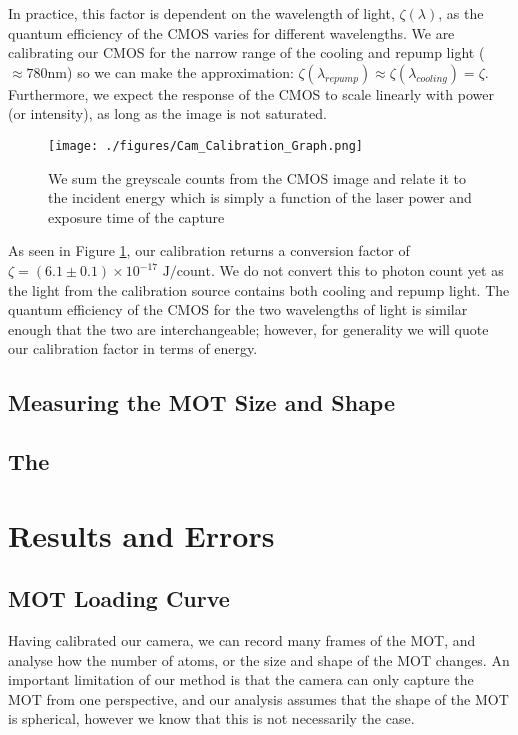 \documentclass[12pt,twoside]{article}
\begin{document}
In practice, this factor is dependent on the wavelength of light, $\zeta(\lambda)$, as the quantum efficiency of the CMOS varies for different wavelengths. We are calibrating our CMOS for the narrow range of the cooling and repump light ($\approx780\text{nm}$) so we can make the approximation: $\zeta(\lambda_{repump})\approx\zeta(\lambda_{cooling})=\zeta$. Furthermore, we expect the response of the CMOS to scale linearly with power (or intensity), as long as the image is not saturated.

\begin{figure}[h]
    \centering
    \texttt{[image: ./figures/Cam\_Calibration\_Graph.png]}
    \caption{We sum the greyscale counts from the CMOS image and relate it to the incident energy which is simply a function of the laser power and exposure time of the capture}
    \label{fig:CamCalib}
\end{figure}
As seen in Figure \ref{fig:CamCalib}, our calibration returns a conversion factor of $\zeta=(6.1\pm0.1)\times10^{-17} \text{ J}/\text{count}$. We do not convert this to photon count yet as the light from the calibration source contains both cooling and repump light. The quantum efficiency of the CMOS for the two wavelengths of light is similar enough that the two are interchangeable; however, for generality we will quote our calibration factor in terms of energy. 

\section{Measuring the MOT Size and Shape}

\section{The }


\chapter{Results and Errors}
\section{MOT Loading Curve}
Having calibrated our camera, we can record many frames of the MOT, and analyse how the number of atoms, or the size and shape of the MOT changes. 
An important limitation of our method is that the camera can only capture the MOT from one perspective, and our analysis assumes that the shape of the MOT is spherical, however we know that this is not necessarily the case. 
\end{document}
